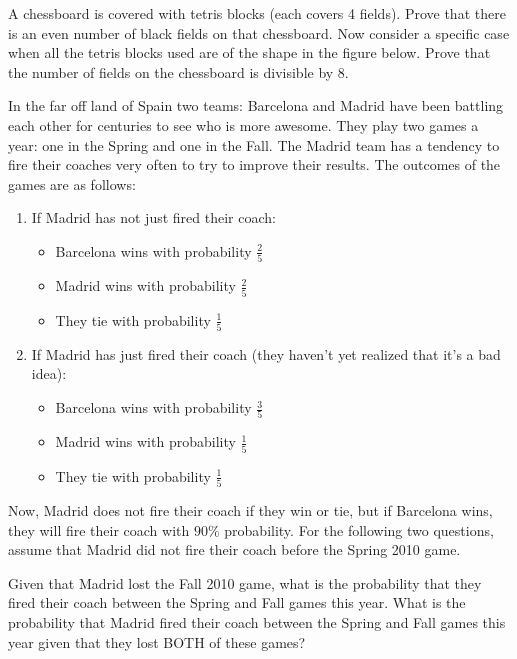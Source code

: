 \documentclass[12pt,oneside]{article}
\begin{document}
\newpage
\begin{problem}{20}
\bparts
{}
A chessboard is covered with tetris blocks (each covers 4 fields). Prove that there is an even number of black fields on that chessboard.
Now consider a specific case when all the tetris blocks used are of the shape in the figure below. Prove that the number of fields on the chessboard is divisible by $8$.
\eparts
\end{problem}

\newpage
\begin{problem}{20}
In the far off land of Spain two teams: Barcelona and Madrid have been battling each other for centuries to see who is more awesome. They play two games a year: one in the Spring and one in the Fall. The Madrid team has a tendency to fire their coaches very often to try to improve their results. The outcomes of the games are as follows:
\begin{enumerate}
\item
If Madrid has not just fired their coach:
\begin{itemize}
\item
Barcelona wins with probability $\frac25$
\item
Madrid wins with probability $\frac25$
\item
They tie with probability $\frac15$
\end{itemize}
\item
If Madrid has just fired their coach (they haven't yet realized that it's a bad idea):
\begin{itemize}
\item
Barcelona wins with probability $\frac35$
\item
Madrid wins with probability $\frac15$
\item
They tie with probability $\frac15$
\end{itemize}
\end{enumerate}
Now, Madrid does not fire their coach if they win or tie, but if Barcelona wins, they will fire their coach with $90\%$ probability.
For the following two questions, assume that Madrid did not fire their coach before the Spring 2010 game.

\bparts
{}
Given that Madrid lost the Fall 2010 game, what is the probability that they fired their coach between the Spring and Fall games this year.
What is the probability that Madrid fired their coach between the Spring and Fall games this year given that they lost BOTH of these games?
\eparts
\end{problem}
\end{document}
